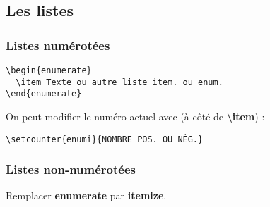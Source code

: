         \subsection{Les listes}
            \subsubsection{Listes numérotées}
            \begin{lstlisting}
\begin{enumerate}
  \item Texte ou autre liste item. ou enum.
\end{enumerate}
            \end{lstlisting}
            On peut modifier le numéro actuel avec (à côté de \textbf{\textbackslash item}) :
            \begin{lstlisting}
\setcounter{enumi}{NOMBRE POS. OU NÉG.}
            \end{lstlisting}
            \subsubsection{Listes non-numérotées}
                Remplacer \textbf{enumerate} par \textbf{itemize}.
